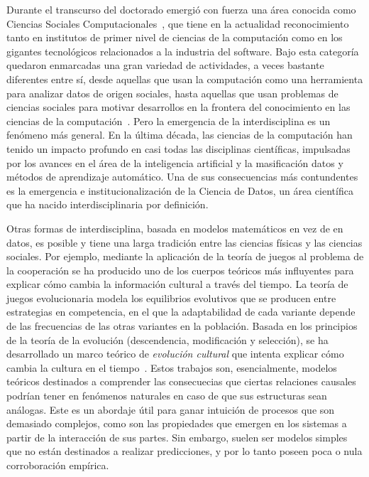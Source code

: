 \documentclass[a4paper,11pt]{book}
\theoremstyle{definition}
\begin{document}
Durante el transcurso del doctorado emergió con fuerza una área conocida como Ciencias Sociales Computacionales~\cite{lazer2009-computationalSocialScience}, que tiene en la actualidad reconocimiento tanto en institutos de primer nivel de ciencias de la computación como en los gigantes tecnológicos relacionados a la industria del software.
%
Bajo esta categoría quedaron enmarcadas una gran variedad de actividades, a veces bastante diferentes entre sí, desde aquellas que usan la computación como una herramienta para analizar datos de origen sociales, hasta aquellas que usan problemas de ciencias sociales para motivar desarrollos en la frontera del conocimiento en las ciencias de la computación~\cite{lazer2020-computationalSocialScience}.
%
Pero la emergencia de la interdisciplina es un fenómeno más general.
%
En la última década, las ciencias de la computación han tenido un impacto profundo en casi todas las disciplinas científicas, impulsadas por los avances en el área de la inteligencia artificial y la masificación datos y métodos de aprendizaje automático.
%
Una de sus consecuencias más contundentes es la emergencia e institucionalización de la Ciencia de Datos, un área científica que ha nacido interdisciplinaria por definición.


Otras formas de interdisciplina, basada en modelos matemáticos en vez de en datos, es posible y tiene una larga tradición entre las ciencias físicas y las ciencias sociales.
%
Por ejemplo, mediante la aplicación de la teoría de juegos al problema de la cooperación se ha producido uno de los cuerpos teóricos más influyentes  para explicar cómo cambia la información cultural a través del tiempo.
%
La teoría de juegos evolucionaria \cite{taylor1978-replicatorDynamic, maynardSmith1982-evolutionGameTheory} modela los equilibrios evolutivos que se producen entre estrategias en competencia, en el que la adaptabilidad de cada variante depende de las frecuencias de las otras variantes en la población.
%
Basada en los principios de la teoría de la evolución (descendencia, modificación y selección), se ha desarrollado un marco teórico de \emph{evolución cultural} que intenta explicar cómo cambia la cultura en el tiempo~\cite{boyd1985-evolutionaryProcess, boyd2005-origin}.
%
Estos trabajos son, esencialmente, modelos teóricos destinados a comprender las consecuecias que ciertas relaciones causales podrían tener en fenómenos naturales en caso de que sus estructuras sean análogas.
%
Este es un abordaje útil para ganar intuición de procesos que son demasiado complejos, como son las propiedades que emergen en los sistemas a partir de la interacción de sus partes.
%
Sin embargo, suelen ser modelos simples que no están destinados a realizar predicciones, y por lo tanto poseen poca o nula corroboración empírica.
\end{document}
